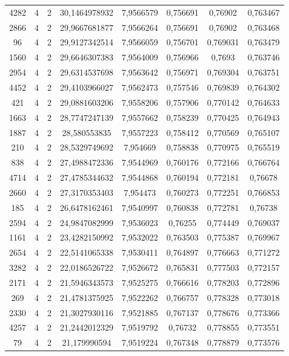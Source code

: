 \begin{longtable}{|c|c|c|c|c|c|c|c|}
4282 & 4 & 2 & 30,1464978932 & 7,9566579 & 0,756691 & 0,76902 & 0,763467 \\
2866 & 4 & 2 & 29,9667681877 & 7,9566264 & 0,756691 & 0,76902 & 0,763468 \\
96 & 4 & 2 & 29,9127342514 & 7,9566059 & 0,756701 & 0,769031 & 0,763479 \\
1560 & 4 & 2 & 29,6646307383 & 7,9564009 & 0,756966 & 0,7693 & 0,763746 \\
2954 & 4 & 2 & 29,6314537698 & 7,9563642 & 0,756971 & 0,769304 & 0,763751 \\
4452 & 4 & 2 & 29,4103966027 & 7,9562473 & 0,757546 & 0,769839 & 0,764302 \\
421 & 4 & 2 & 29,0881603206 & 7,9558206 & 0,757906 & 0,770142 & 0,764633 \\
1663 & 4 & 2 & 28,7747247139 & 7,9557662 & 0,758239 & 0,770425 & 0,764943 \\
1887 & 4 & 2 & 28,580553835 & 7,9557223 & 0,758412 & 0,770569 & 0,765107 \\
210 & 4 & 2 & 28,5329749692 & 7,954669 & 0,758838 & 0,770975 & 0,765519 \\
838 & 4 & 2 & 27,4988472336 & 7,9544969 & 0,760176 & 0,772166 & 0,766764 \\
4714 & 4 & 2 & 27,4785344632 & 7,9544868 & 0,760194 & 0,772181 & 0,76678 \\
2660 & 4 & 2 & 27,3170353403 & 7,954473 & 0,760273 & 0,772251 & 0,766853 \\
185 & 4 & 2 & 26,6478162461 & 7,9540997 & 0,760838 & 0,772781 & 0,76738 \\
2594 & 4 & 2 & 24,9847082999 & 7,9536023 & 0,76255 & 0,774449 & 0,769037 \\
1161 & 4 & 2 & 23,4282150992 & 7,9532022 & 0,763503 & 0,775387 & 0,769967 \\
2654 & 4 & 2 & 22,5141065338 & 7,9530411 & 0,764897 & 0,776663 & 0,771272 \\
3282 & 4 & 2 & 22,0186526722 & 7,9526672 & 0,765831 & 0,777503 & 0,772157 \\
2171 & 4 & 2 & 21,5946343573 & 7,9525275 & 0,766616 & 0,778203 & 0,772896 \\
269 & 4 & 2 & 21,4781375925 & 7,9522262 & 0,766757 & 0,778328 & 0,773018 \\
2330 & 4 & 2 & 21,3027930116 & 7,9521885 & 0,767137 & 0,778676 & 0,773366 \\
4257 & 4 & 2 & 21,2442012329 & 7,9519792 & 0,76732 & 0,778855 & 0,773551 \\
79 & 4 & 2 & 21,179990594 & 7,9519224 & 0,767348 & 0,778879 & 0,773576 \\

\end{longtable}
